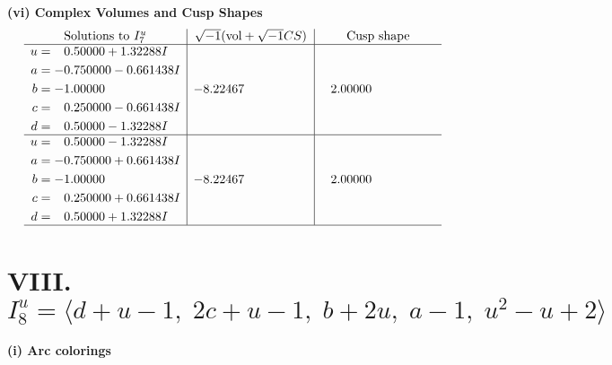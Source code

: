 \documentclass[1p]{elsarticle_modified}
\theoremstyle{definition}
\newcommand{\I}{\sqrt{-1}}
\begin{document}
\newpage\flushleft \textbf{(vi) Complex Volumes and Cusp Shapes}
$$\begin{array}{c|c|c}  
\text{Solutions to }I^u_{7}& \I (\text{vol} + \sqrt{-1}CS) & \text{Cusp shape}\\
 \hline 
\begin{aligned}
u &= \phantom{-}0.50000 + 1.32288 I \\
a &= -0.750000 - 0.661438 I \\
b &= -1.00000\phantom{ +0.000000I} \\
c &= \phantom{-}0.250000 - 0.661438 I \\
d &= \phantom{-}0.50000 - 1.32288 I\end{aligned}
 & -8.22467\phantom{ +0.000000I} & \phantom{-}2.00000\phantom{ +0.000000I} \\ \hline\begin{aligned}
u &= \phantom{-}0.50000 - 1.32288 I \\
a &= -0.750000 + 0.661438 I \\
b &= -1.00000\phantom{ +0.000000I} \\
c &= \phantom{-}0.250000 + 0.661438 I \\
d &= \phantom{-}0.50000 + 1.32288 I\end{aligned}
 & -8.22467\phantom{ +0.000000I} & \phantom{-}2.00000\phantom{ +0.000000I}\\
 \hline 
 \end{array}$$\newpage\newpage\renewcommand{\arraystretch}{1}
\centering \section*{VIII. $I^u_{8}= \langle d+u-1,\;2 c+u-1,\;b+2 u,\;a-1,\;u^2- u+2 \rangle$}
\flushleft \textbf{(i) Arc colorings}\\
\end{document}
